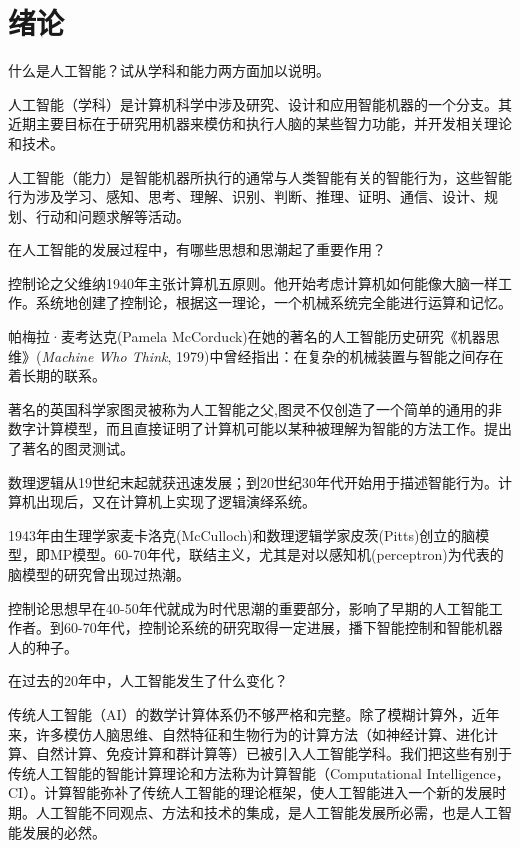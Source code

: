\chapter{绪论}

\begin{question}
什么是人工智能？试从学科和能力两方面加以说明。
\end{question}	
\begin{solution}
人工智能（学科）是计算机科学中涉及研究、设计和应用智能机器的一个分支。其近期主要目标在于研究用机器来模仿和执行人脑的某些智力功能，并开发相关理论和技术。\par
人工智能（能力）是智能机器所执行的通常与人类智能有关的智能行为，这些智能行为涉及学习、感知、思考、理解、识别、判断、推理、证明、通信、设计、规划、行动和问题求解等活动。
\end{solution}

\begin{question}
在人工智能的发展过程中，有哪些思想和思潮起了重要作用？
\end{question}
\begin{solution}
控制论之父维纳1940年主张计算机五原则。他开始考虑计算机如何能像大脑一样工作。系统地创建了控制论，根据这一理论，一个机械系统完全能进行运算和记忆。\par
帕梅拉·麦考达克(Pamela McCorduck)在她的著名的人工智能历史研究《机器思维》(\textit{Machine Who Think}, 1979)中曾经指出：在复杂的机械装置与智能之间存在着长期的联系。\par
著名的英国科学家图灵被称为人工智能之父,图灵不仅创造了一个简单的通用的非数字计算模型，而且直接证明了计算机可能以某种被理解为智能的方法工作。提出了著名的图灵测试。\par
数理逻辑从19世纪末起就获迅速发展；到20世纪30年代开始用于描述智能行为。计算机出现后，又在计算机上实现了逻辑演绎系统。\par
1943年由生理学家麦卡洛克(McCulloch)和数理逻辑学家皮茨(Pitts)创立的脑模型，即MP模型。60-70年代，联结主义，尤其是对以感知机(perceptron)为代表的脑模型的研究曾出现过热潮。\par
控制论思想早在40-50年代就成为时代思潮的重要部分，影响了早期的人工智能工作者。到60-70年代，控制论系统的研究取得一定进展，播下智能控制和智能机器人的种子。 
\end{solution}

\begin{question}
在过去的20年中，人工智能发生了什么变化？
\end{question}
\begin{solution}
传统人工智能（AI）的数学计算体系仍不够严格和完整。除了模糊计算外，近年来，许多模仿人脑思维、自然特征和生物行为的计算方法（如神经计算、进化计算、自然计算、免疫计算和群计算等）已被引入人工智能学科。我们把这些有别于传统人工智能的智能计算理论和方法称为计算智能（Computational Intelligence，CI）。计算智能弥补了传统人工智能的理论框架，使人工智能进入一个新的发展时期。人工智能不同观点、方法和技术的集成，是人工智能发展所必需，也是人工智能发展的必然。
\end{solution}

